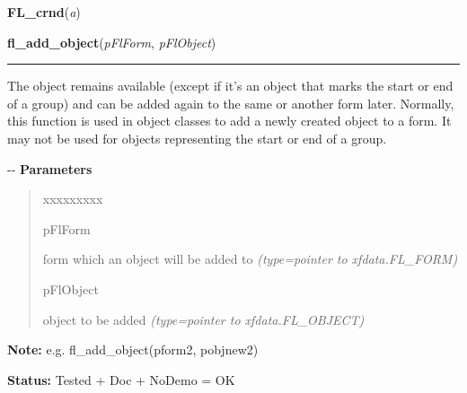     \label{xformslib:flbasic:FL_crnd}

    \vspace{0.5ex}

\hspace{.8\funcindent}\begin{boxedminipage}{\funcwidth}

    \raggedright \textbf{FL\_crnd}(\textit{a})

\setlength{\parskip}{2ex}
\setlength{\parskip}{1ex}
    \end{boxedminipage}

    \label{xformslib:flbasic:fl_add_object}

    \vspace{0.5ex}

\hspace{.8\funcindent}\begin{boxedminipage}{\funcwidth}

    \raggedright \textbf{fl\_add\_object}(\textit{pFlForm}, \textit{pFlObject})

    \vspace{-1.5ex}

    \rule{\textwidth}{0.5\fboxrule}
\setlength{\parskip}{2ex}

The object remains available (except if it's an object that marks the
start or end of a group) and can be added again to the same or another form
later. Normally, this function is used in object classes to add a newly
created object to a form. It may not be used for objects representing the
start or end of a group.

-{}-
\setlength{\parskip}{1ex}
      \textbf{Parameters}
      \vspace{-1ex}

      \begin{quote}
        \begin{Ventry}{xxxxxxxxx}

          \item[pFlForm]


form which an object will be added to
            {\it (type=pointer to xfdata.FL\_FORM)}

          \item[pFlObject]


object to be added
            {\it (type=pointer to xfdata.FL\_OBJECT)}

        \end{Ventry}

      \end{quote}

\textbf{Note:} 
e.g. fl\_add\_object(pform2, pobjnew2)


\textbf{Status:} 
Tested + Doc + NoDemo = OK


    \end{boxedminipage}

